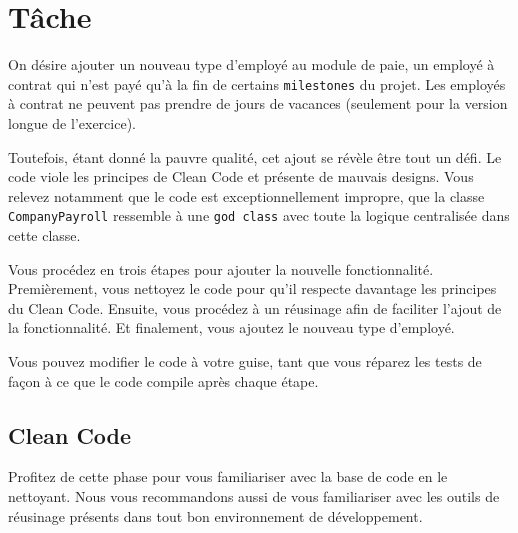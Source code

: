 \documentclass[french]{article}
\begin{document}
\section{Tâche}
On désire ajouter un nouveau type d'employé au module de paie, un employé à contrat qui n'est payé qu'à la fin de certains \texttt{milestones} du projet. Les employés à contrat ne peuvent pas prendre de jours de vacances (seulement pour la version longue de l'exercice).

Toutefois, étant donné la pauvre qualité, cet ajout se révèle être tout un défi. Le code viole les principes de Clean Code et présente de mauvais designs. Vous relevez notamment que le code est exceptionnellement impropre, que la classe \texttt{CompanyPayroll} ressemble à une \texttt{god class} avec toute la logique centralisée dans cette classe.

Vous procédez en trois étapes pour ajouter la nouvelle fonctionnalité. Premièrement, vous nettoyez le code pour qu'il respecte davantage les principes du Clean Code. Ensuite, vous procédez à un réusinage afin de faciliter l'ajout de la fonctionnalité. Et finalement, vous ajoutez le nouveau type d'employé.

Vous pouvez modifier le code à votre guise, tant que vous réparez les tests de façon à ce que le code compile après chaque étape.

\subsection{Clean Code}

Profitez de cette phase pour vous familiariser avec la base de code en le nettoyant. Nous vous recommandons aussi de vous familiariser avec les outils de réusinage présents dans tout bon environnement de développement.


\end{document}
